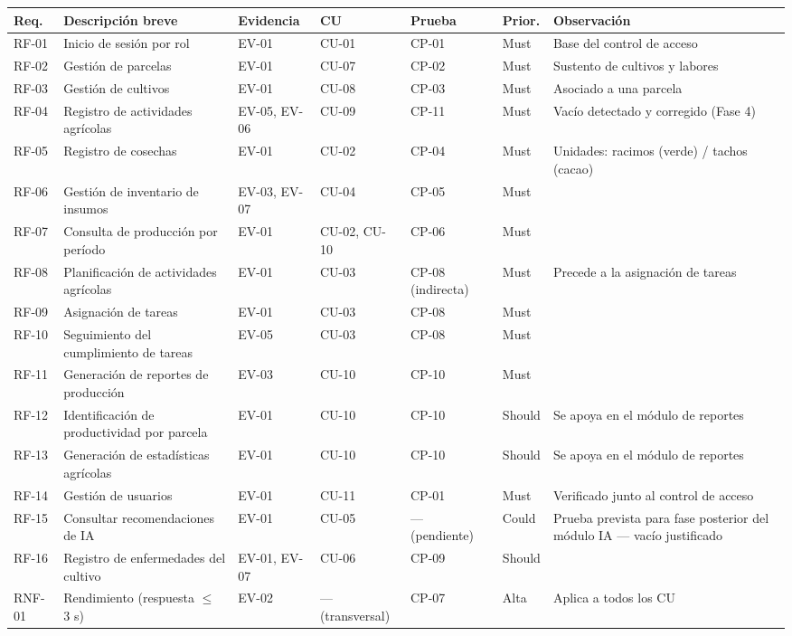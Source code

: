 \documentclass[12pt,a4paper]{article}
\begin{document}
\begin{longtable}{@{}p{1.2cm}p{3.5cm}p{2.5cm}p{2.5cm}p{2cm}p{1.2cm}p{3.5cm}@{}}
\toprule
\textbf{Req.} & \textbf{Descripción breve} & \textbf{Evidencia} & \textbf{CU} & \textbf{Prueba} & \textbf{Prior.} & \textbf{Observación} \\
\midrule
\endhead
RF-01 & Inicio de sesión por rol & EV-01 & CU-01 & CP-01 & Must & Base del control de acceso \\
RF-02 & Gestión de parcelas & EV-01 & CU-07 & CP-02 & Must & Sustento de cultivos y labores \\
RF-03 & Gestión de cultivos & EV-01 & CU-08 & CP-03 & Must & Asociado a una parcela \\
RF-04 & Registro de actividades agrícolas & EV-05, EV-06 & CU-09 & CP-11 & Must & Vacío detectado y corregido (Fase 4) \\
RF-05 & Registro de cosechas & EV-01 & CU-02 & CP-04 & Must & Unidades: racimos (verde) / tachos (cacao) \\
RF-06 & Gestión de inventario de insumos & EV-03, EV-07 & CU-04 & CP-05 & Must & \\
RF-07 & Consulta de producción por período & EV-01 & CU-02, CU-10 & CP-06 & Must & \\
RF-08 & Planificación de actividades agrícolas & EV-01 & CU-03 & CP-08 (indirecta) & Must & Precede a la asignación de tareas \\
RF-09 & Asignación de tareas & EV-01 & CU-03 & CP-08 & Must & \\
RF-10 & Seguimiento del cumplimiento de tareas & EV-05 & CU-03 & CP-08 & Must & \\
RF-11 & Generación de reportes de producción & EV-03 & CU-10 & CP-10 & Must & \\
RF-12 & Identificación de productividad por parcela & EV-01 & CU-10 & CP-10 & Should & Se apoya en el módulo de reportes \\
RF-13 & Generación de estadísticas agrícolas & EV-01 & CU-10 & CP-10 & Should & Se apoya en el módulo de reportes \\
RF-14 & Gestión de usuarios & EV-01 & CU-11 & CP-01 & Must & Verificado junto al control de acceso \\
RF-15 & Consultar recomendaciones de IA & EV-01 & CU-05 & --- (pendiente) & Could & Prueba prevista para fase posterior del módulo IA --- vacío justificado \\
RF-16 & Registro de enfermedades del cultivo & EV-01, EV-07 & CU-06 & CP-09 & Should & \\
RNF-01 & Rendimiento (respuesta $\leq$ 3 s) & EV-02 & --- (transversal) & CP-07 & Alta & Aplica a todos los CU \\

\end{longtable}
\end{document}
